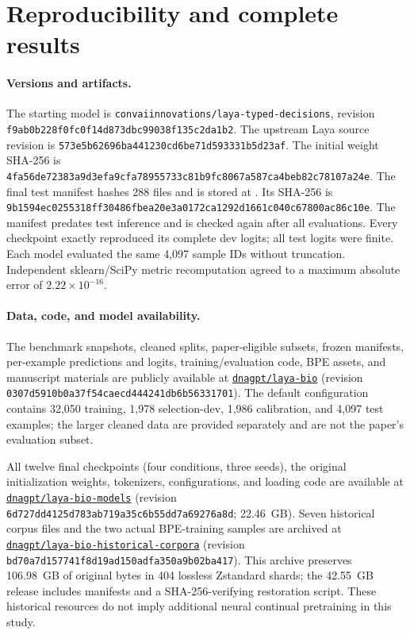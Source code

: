 \section{Reproducibility and complete results}
\paragraph{Versions and artifacts.}
The starting model is \texttt{convaiinnovations/laya-typed-decisions}, revision
\nolinkurl{f9ab0b228f0fc0f14d873dbc99038f135c2da1b2}.
The upstream Laya source revision is
\nolinkurl{573e5b62696ba441230cd6be71d593331b5d23af}.
The initial weight SHA-256 is
\nolinkurl{4fa56de72383a9d3efa9cfa78955733c81b9fc8067a587ca4beb82c78107a24e}.
The final test manifest hashes 288 files and is stored at
.
Its SHA-256 is
\nolinkurl{9b1594ec0255318ff30486fbea20e3a0172ca1292d1661c040c67800ac86c10e}.
The manifest predates test inference and is checked again after all evaluations. Every checkpoint exactly reproduced its complete dev logits; all test logits were finite. Each model evaluated the same 4,097 sample IDs without truncation. Independent sklearn/SciPy metric recomputation agreed to a maximum absolute error of $2.22\times10^{-16}$.

\paragraph{Data, code, and model availability.}
\label{sec:availability}
The benchmark snapshots, cleaned splits, paper-eligible subsets, frozen manifests, per-example predictions and logits, training/evaluation code, BPE assets, and manuscript materials are publicly available at \href{https://huggingface.co/datasets/dnagpt/laya-bio/tree/0307d5910b0a37f54caecd444241db6b56331701}{\texttt{dnagpt/laya-bio}} (revision \nolinkurl{0307d5910b0a37f54caecd444241db6b56331701}). The default configuration contains 32,050 training, 1,978 selection-dev, 1,986 calibration, and 4,097 test examples; the larger cleaned data are provided separately and are not the paper's evaluation subset.

All twelve final checkpoints (four conditions, three seeds), the original initialization weights, tokenizers, configurations, and loading code are available at \href{https://huggingface.co/dnagpt/laya-bio-models/tree/6d727dd4125d783ab719a35c6b55dd7a69276a8d}{\texttt{dnagpt/laya-bio-models}} (revision \nolinkurl{6d727dd4125d783ab719a35c6b55dd7a69276a8d}; 22.46~GB). Seven historical corpus files and the two actual BPE-training samples are archived at \href{https://huggingface.co/datasets/dnagpt/laya-bio-historical-corpora/tree/bd70a7d157741f8d19ad150adfa350a9b02ba417}{\texttt{dnagpt/laya-bio-historical-corpora}} (revision \nolinkurl{bd70a7d157741f8d19ad150adfa350a9b02ba417}). This archive preserves 106.98~GB of original bytes in 404 lossless Zstandard shards; the 42.55~GB release includes manifests and a SHA-256-verifying restoration script. These historical resources do not imply additional neural continual pretraining in this study.

